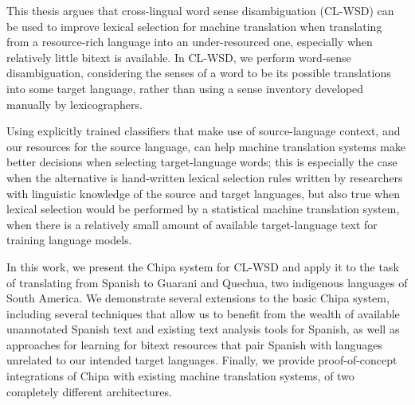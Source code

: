 This thesis argues that cross-lingual word sense disambiguation (CL-WSD) can be
used to improve lexical selection for machine translation when translating from
a resource-rich language into an under-resourced one, especially when relatively
little bitext is available.  In CL-WSD, we perform word-sense disambiguation,
considering the senses of a word to be its possible translations into some
target language, rather than using a sense inventory developed manually by
lexicographers.

Using explicitly trained classifiers that make use of source-language context,
and our resources for the source language, can help machine translation systems
make better decisions when selecting target-language words; this is especially
the case when the alternative is hand-written lexical selection rules written by
researchers with linguistic knowledge of the source and target languages, but
also true when lexical selection would be performed by a statistical machine
translation system, when there is a relatively small amount of available
target-language text for training language models.

In this work, we present the Chipa system for CL-WSD and apply it to the task of
translating from Spanish to Guarani and Quechua, two indigenous languages of
South America. We demonstrate several extensions to the basic Chipa system,
including several techniques that allow us to benefit from the wealth of
available unannotated Spanish text and existing text analysis tools for Spanish,
as well as approaches for learning for bitext resources that pair Spanish with
languages unrelated to our intended target languages. Finally, we provide
proof-of-concept integrations of Chipa with existing machine translation
systems, of two completely different architectures.
